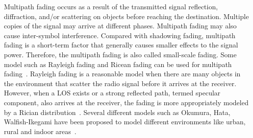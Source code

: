Multipath fading occurs as a result of the transmitted signal reflection, diffraction, and/or scattering on objects before reaching the destination.
Multiple copies of the signal may arrive at different phases.
Multipath fading may also cause inter-symbol interference.
Compared with shadowing fading, multipath fading is a short-term factor that generally causes smaller effects to the signal power.
Therefore, the multipath fading is also called small-scale fading.
Some model such as Rayleigh fading and Ricean fading can be used for multipath fading~\cite{rappaport1996wireless}.
Rayleigh fading is a reasonable model when there are many objects in the environment that scatter the radio signal before it arrives at the receiver.
However, when a LOS exists or a strong reflected path, termed specular component, also arrives at the receiver, the fading is more appropriately modeled by a Rician distribution~\cite{stuber2011principles}.
Several different models such as Okumura, Hata, Walfish-Ikegami have been proposed to model different environments like urban, rural and indoor areas~\cite{stuber2011principles}.

